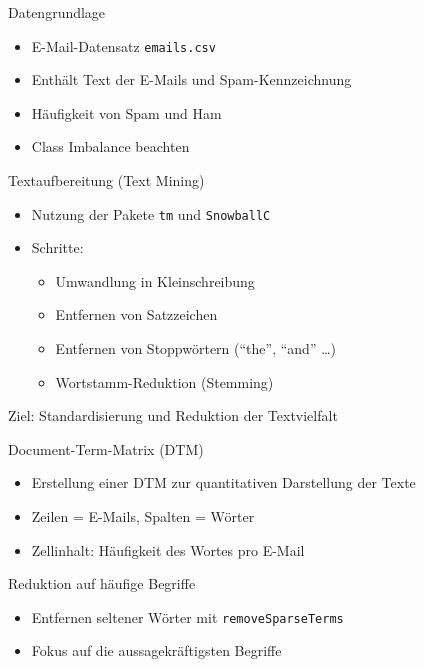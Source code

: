 \documentclass[
  ignorenonframetext,
]{beamer}
\providecommand{\tightlist}{%
  \setlength{\itemsep}{0pt}\setlength{\parskip}{0pt}}
\begin{document}
\begin{frame}[fragile]{Datengrundlage}
\protect{}\label{datengrundlage}
\begin{itemize}
\tightlist
\item
  E-Mail-Datensatz \texttt{emails.csv}
\item
  Enthält Text der E-Mails und Spam-Kennzeichnung
\item
  Häufigkeit von Spam und Ham
\item
  Class Imbalance beachten
\end{itemize}
\end{frame}

\begin{frame}[fragile]{Textaufbereitung (Text Mining)}
\protect{}\label{textaufbereitung-text-mining}
\begin{itemize}
\tightlist
\item
  Nutzung der Pakete \texttt{tm} und \texttt{SnowballC}
\item
  Schritte:

  \begin{itemize}
  \tightlist
  \item
    Umwandlung in Kleinschreibung
  \item
    Entfernen von Satzzeichen
  \item
    Entfernen von Stoppwörtern (``the'', ``and'' \ldots)
  \item
    Wortstamm-Reduktion (Stemming)
  \end{itemize}
\end{itemize}

Ziel: Standardisierung und Reduktion der Textvielfalt
\end{frame}

\begin{frame}{Document-Term-Matrix (DTM)}
\protect{}\label{document-term-matrix-dtm}
\begin{itemize}
\tightlist
\item
  Erstellung einer DTM zur quantitativen Darstellung der Texte
\item
  Zeilen = E-Mails, Spalten = Wörter
\item
  Zellinhalt: Häufigkeit des Wortes pro E-Mail
\end{itemize}
\end{frame}

\begin{frame}[fragile]{Reduktion auf häufige Begriffe}
\protect{}\label{reduktion-auf-huxe4ufige-begriffe}
\begin{itemize}
\tightlist
\item
  Entfernen seltener Wörter mit \texttt{removeSparseTerms}
\item
  Fokus auf die aussagekräftigsten Begriffe
\end{itemize}
\end{frame}
\end{document}

